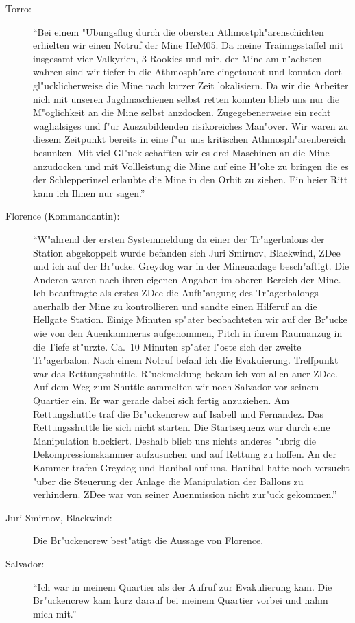 \begin{description}
	\item[Torro:] "`Bei einem "Ubungsflug durch die obersten Athmostph"arenschichten erhielten wir einen Notruf der Mine HeM05. Da meine Trainngsstaffel mit insgesamt vier Valkyrien, 3 Rookies und mir, der Mine am n"achsten wahren sind wir tiefer in die Athmosph"are eingetaucht und konnten dort gl"ucklicherweise die Mine nach kurzer Zeit lokalisiern. Da wir die Arbeiter nich mit unseren Jagdmaschienen selbst retten konnten blieb uns nur die M"oglichkeit an die Mine selbst anzdocken. Zugegebenerweise ein recht waghalsiges und f"ur Auszubildenden risikoreiches Man"over. Wir waren zu diesem Zeitpunkt bereits in eine f"ur uns kritischen Athmosph"arenbereich besunken. Mit viel Gl"uck schafften wir es drei Maschinen an die Mine anzudocken und mit Vollleistung die Mine auf eine H"ohe zu bringen die es der Schlepperinsel erlaubte die Mine in den Orbit zu ziehen. Ein hei\3er Ritt kann ich Ihnen nur sagen."'
	\item[Florence (Kommandantin):] "`W"ahrend der ersten Systemmeldung da\3 einer der Tr"agerbalons der Station abgekoppelt wurde befanden sich Juri Smirnov, Blackwind, ZDee und ich auf der Br"ucke. Greydog war in der Minenanlage besch"aftigt. Die Anderen waren nach ihren eigenen Angaben im oberen Bereich der Mine. Ich beauftragte als erstes ZDee die Aufh"angung des Tr"agerbalongs au\3erhalb der Mine zu kontrollieren und sandte einen Hilferuf an die Hellgate Station. Einige Minuten sp"ater beobachteten wir auf der Br"ucke wie von den Au\3enkammeras aufgenommen, Pitch in ihrem Raumanzug in die Tiefe st"urzte. Ca.~10 Minuten sp"ater l"oste sich der zweite Tr"agerbalon. Nach einem Notruf befahl ich die Evakuierung. Treffpunkt war das Rettungsshuttle. R"uckmeldung bekam ich von allen au\3er ZDee. Auf dem Weg zum Shuttle sammelten wir noch Salvador vor seinem Quartier ein. Er war gerade dabei sich fertig anzuziehen. Am Rettungshuttle traf die Br"uckencrew auf Isabell und Fernandez. Das Rettungsshuttle lie\3 sich nicht starten. Die Startsequenz war durch eine Manipulation blockiert. Deshalb blieb uns nichts anderes "ubrig die Dekompressionskammer aufzusuchen und auf Rettung zu hoffen. An der Kammer trafen Greydog und Hanibal auf uns. Hanibal hatte noch versucht "uber die Steuerung der Anlage die Manipulation der Ballons zu verhindern. ZDee war von seiner Au\3enmission nicht zur"uck gekommen."'
	\item[Juri Smirnov, Blackwind:] Die Br"uckencrew best"atigt die Aussage von Florence.
	\item[Salvador:] "`Ich war in meinem Quartier als der Aufruf zur Evakulierung kam. Die Br"uckencrew kam kurz darauf bei meinem Quartier vorbei und nahm mich mit."' 

\end{description}
